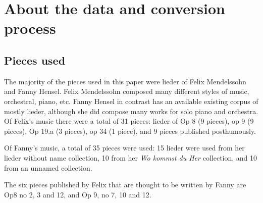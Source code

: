 \documentclass[12pt,twoside]{reedthesis}
\theoremstyle{definition}
\theoremstyle{definition}
\theoremstyle{definition}
\theoremstyle{remark}
\begin{document}
\chapter{About the data and conversion
process}\label{about-the-data-and-conversion-process}

\section{Pieces used}\label{pieces-used}

The majority of the pieces used in this paper were lieder of Felix
Mendelssohn and Fanny Hensel. Felix Mendelssohn composed many different
styles of music, orchestral, piano, etc. Fanny Hensel in contrast has an
available existing corpus of mostly lieder, although she did compose
many works for solo piano and orchestra. Of Felix's music there were a
total of 31 pieces: lieder of Op 8 (9 pieces), op 9 (9 pieces), Op 19.a
(3 pieces), op 34 (1 piece), and 9 pieces published posthumously.

Of Fanny's music, a total of 35 pieces were used: 15 lieder were used
from her lieder without name collection, 10 from her \emph{Wo kommst du
Her} collection, and 10 from an unnamed collection.

The six pieces published by Felix that are thought to be written by
Fanny are Op8 no 2, 3 and 12, and Op 9, no 7, 10 and 12.
\end{document}
